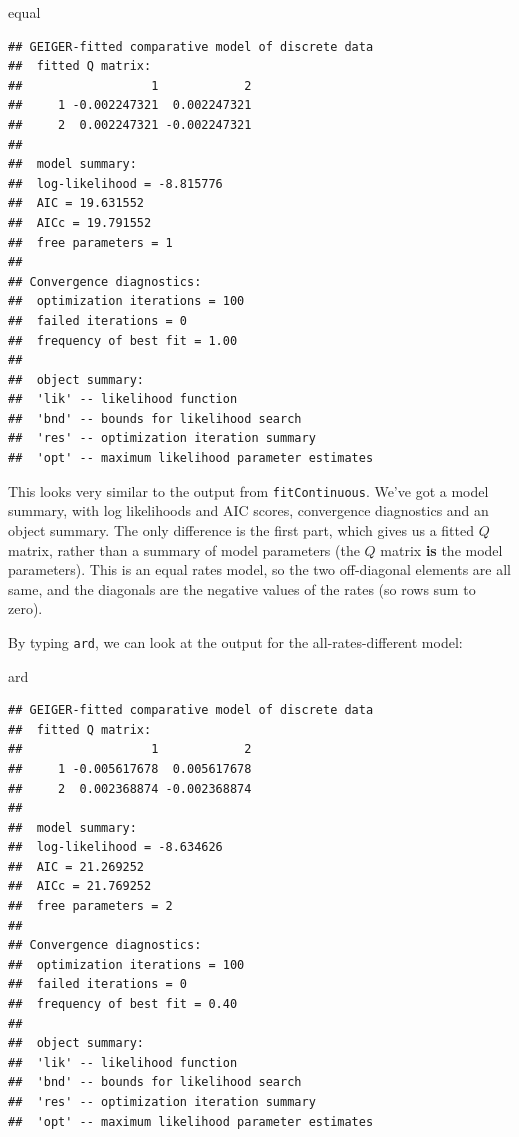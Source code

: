 \documentclass[]{book}
\newenvironment{Shaded}{\begin{snugshade}}{\end{snugshade}}
\newcommand{\NormalTok}[1]{{#1}}
\begin{document}
\begin{Shaded}
\begin{Highlighting}[]
\NormalTok{equal}
\end{Highlighting}
\end{Shaded}

\begin{verbatim}
## GEIGER-fitted comparative model of discrete data
##  fitted Q matrix:
##                  1            2
##     1 -0.002247321  0.002247321
##     2  0.002247321 -0.002247321
## 
##  model summary:
##  log-likelihood = -8.815776
##  AIC = 19.631552
##  AICc = 19.791552
##  free parameters = 1
## 
## Convergence diagnostics:
##  optimization iterations = 100
##  failed iterations = 0
##  frequency of best fit = 1.00
## 
##  object summary:
##  'lik' -- likelihood function
##  'bnd' -- bounds for likelihood search
##  'res' -- optimization iteration summary
##  'opt' -- maximum likelihood parameter estimates
\end{verbatim}

This looks very similar to the output from \texttt{fitContinuous}. We've
got a model summary, with log likelihoods and AIC scores, convergence
diagnostics and an object summary. The only difference is the first
part, which gives us a fitted \(Q\) matrix, rather than a summary of
model parameters (the \(Q\) matrix \textbf{is} the model parameters).
This is an equal rates model, so the two off-diagonal elements are all
same, and the diagonals are the negative values of the rates (so rows
sum to zero).

By typing \texttt{ard}, we can look at the output for the
all-rates-different model:

\begin{Shaded}
\begin{Highlighting}[]
\NormalTok{ard}
\end{Highlighting}
\end{Shaded}

\begin{verbatim}
## GEIGER-fitted comparative model of discrete data
##  fitted Q matrix:
##                  1            2
##     1 -0.005617678  0.005617678
##     2  0.002368874 -0.002368874
## 
##  model summary:
##  log-likelihood = -8.634626
##  AIC = 21.269252
##  AICc = 21.769252
##  free parameters = 2
## 
## Convergence diagnostics:
##  optimization iterations = 100
##  failed iterations = 0
##  frequency of best fit = 0.40
## 
##  object summary:
##  'lik' -- likelihood function
##  'bnd' -- bounds for likelihood search
##  'res' -- optimization iteration summary
##  'opt' -- maximum likelihood parameter estimates
\end{verbatim}
\end{document}
